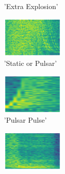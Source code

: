 \begin{figure}[H]
{\begin{subfigure}{0.23\textwidth}
{{        }\hspace*{0.75cm}%
      }%
      \caption*{'Extra Explosion'}
    \end{subfigure}
    \begin{subfigure}{0.23\textwidth}
      \includegraphics[width=3cm]{sounds/buttons/19.wav-button.png}%
      \caption*{'Static or Pulsar'}
    \end{subfigure}
    \begin{subfigure}{0.23\textwidth}
      \includegraphics[width=3cm]{sounds/buttons/20.wav-button.png}%
      \caption*{'Pulsar Pulse'}
    \end{subfigure}
    \begin{subfigure}{0.23\textwidth}
      \includegraphics[width=3cm]{sounds/buttons/21.wav-button.png}%
\end{subfigure}}
\end{figure}
